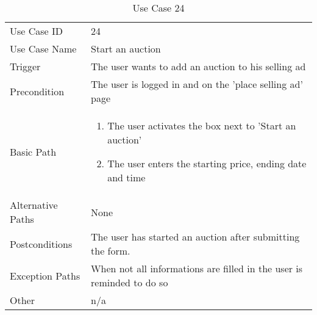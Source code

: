 \begin{table}[H]
\centering
\label{table-use-case-24}
\begin{tabular}{|p{3cm}|p{10cm}}
Use Case ID       & 24                                                      \\
Use Case Name     & Start an auction                            \\
Trigger           & The user wants to add an auction to his selling ad\\
Precondition      & The user is logged in and on the 'place selling ad' page
\\
Basic Path        & \begin{enumerate}
\item		The user activates the box next to 'Start an auction'
\item             The user enters the starting price, ending date and time

\end{enumerate} 
     \\
Alternative Paths & None                          \\
Postconditions    & The user has started an auction after submitting the form.\\
Exception Paths   & When not all informations are filled in the user is reminded to do so			\\
Other             & n/a                                                                                                                                                                                                        
\end{tabular}
\caption{Use Case 24}
\end{table}


